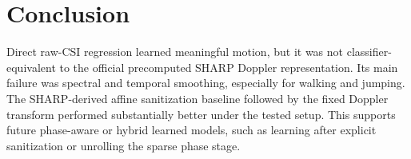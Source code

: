 \section{Conclusion}
\label{sec:conclusion}

Direct raw-CSI regression learned meaningful motion,
but it was not classifier-equivalent to the official precomputed SHARP Doppler
representation.
Its main failure was spectral and temporal smoothing, especially for walking
and jumping. The SHARP-derived affine sanitization baseline followed by the
fixed Doppler transform performed substantially better under the tested setup. This supports
future phase-aware or hybrid learned models, such as learning after explicit
sanitization or unrolling the sparse phase stage.